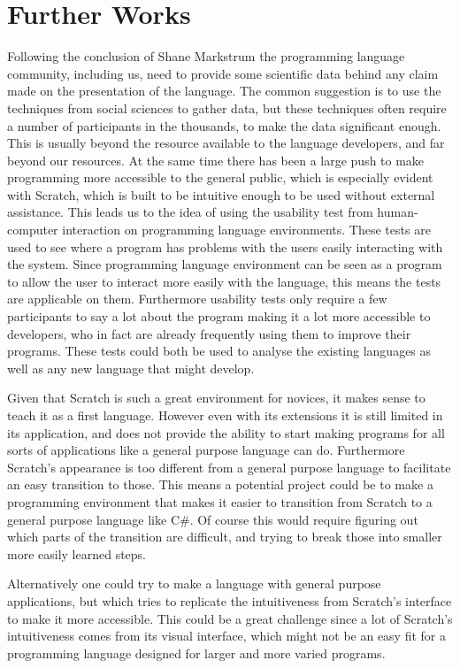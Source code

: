 \section{Further Works}
\label{sec:further_works}
Following the conclusion of Shane Markstrum\cite{ShaneMarkstrum10} the programming language community, including us, need to provide some scientific data behind any claim made on the presentation of the language.
The common suggestion is to use the techniques from social sciences to gather data, but these techniques often require a number of participants in the thousands, to make the data significant enough.
This is usually beyond the resource available to the language developers, and far beyond our resources.
At the same time there has been a large push to make programming more accessible to the general public, which is especially evident with Scratch, which is built to be intuitive enough to be used without external assistance.
This leads us to the idea of using the usability test from human-computer interaction on programming language environments.
These tests are used to see where a program has problems with the users easily interacting with the system.
Since programming language environment can be seen as a program to allow the user to interact more easily with the language, this means the tests are applicable on them.
Furthermore usability tests only require a few participants to say a lot about the program making it a lot more accessible to developers, who in fact are already frequently using them to improve their programs.
These tests could both be used to analyse the existing languages as well as any new language that might develop.

Given that Scratch is such a great environment for novices, it makes sense to teach it as a first language.
However even with its extensions it is still limited in its application, and does not provide the ability to start making programs for all sorts of applications like a general purpose language can do.
Furthermore Scratch's appearance is too different from a general purpose language to facilitate an easy transition to those.
This means a potential project could be to make a programming environment that makes it easier to transition from Scratch to a general purpose language like C\#.
Of course this would require figuring out which parts of the transition are difficult, and trying to break those into smaller more easily learned steps.

Alternatively one could try to make a language with general purpose applications, but which tries to replicate the intuitiveness from Scratch's interface to make it more accessible.
This could be a great challenge since a lot of Scratch's intuitiveness comes from its visual interface, which might not be an easy fit for a programming language designed for larger and more varied programs.

